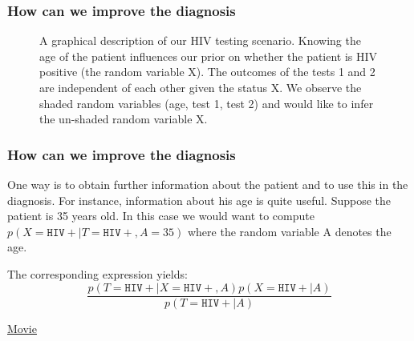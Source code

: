 \begin{frame}
    \frametitle{How can we improve the diagnosis}


    \center

    \begin{figure}
        \caption{A graphical description of our HIV testing scenario. Knowing the age of the patient influences our prior on whether the patient is HIV positive (the random variable X). The outcomes of the tests 1 and 2 are independent of each other given the status X. We observe the shaded random variables (age, test 1, test 2) and would like to infer the un-shaded random variable X.}
    \end{figure}

\end{frame}


\begin{frame}
    \frametitle{How can we improve the diagnosis}

    \begin{parchment}
    One way is to obtain further information about the patient and to use this in the diagnosis. For instance, information about his age is quite useful. Suppose the patient is 35 years old. In this case we would want to compute $p(X = \mathtt{HIV+}|T = \mathtt{HIV+}, A = 35)$ where the random variable A denotes the age.
    \end{parchment}

    The corresponding expression yields:
    $$
    \frac{p(T=\mathtt{HIV+}|X=\mathtt{HIV+},A)p(X=\mathtt{HIV+}|A)}{p(T=\mathtt{HIV+}|A)}
    $$
\end{frame}

\begin{frame}
  
\href{run:out.mp4}{Movie} 
\end{frame}

